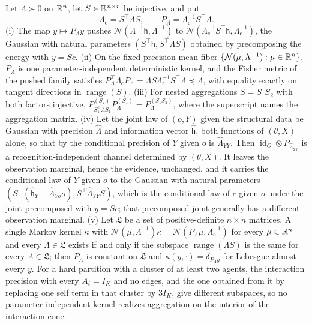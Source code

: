 Let \(\Lambda\succ0\) on \(\mathbb R^n\), let \(S\in\mathbb R^{n\times r}\) be injective,
and put
\begin{equation}
\Lambda_{\mathrm c}=S^\top\Lambda S,
\qquad
P_\Lambda=\Lambda_{\mathrm c}^{-1}S^\top\Lambda .
\label{eq:ig-galerkin-projector}
\end{equation}
(i) The map \(y\mapsto P_\Lambda y\) pushes
\(\mathcal N(\Lambda^{-1}\mathsf h,\Lambda^{-1})\) to
\(\mathcal N(\Lambda_{\mathrm c}^{-1}S^\top\mathsf h,\Lambda_{\mathrm c}^{-1})\),
the Gaussian with natural parameters \((S^\top\mathsf h,S^\top\Lambda S)\)
obtained by precomposing the energy with \(y=Sc\).
(ii) On the fixed-precision mean fiber
\(\{\mathcal N(\mu,\Lambda^{-1}):\mu\in\mathbb R^n\}\), \(P_\Lambda\) is one
parameter-independent deterministic kernel, and the Fisher metric of the pushed
family satisfies
\(P_\Lambda^\top\Lambda_{\mathrm c}P_\Lambda
=\Lambda S\Lambda_{\mathrm c}^{-1}S^\top\Lambda\preceq\Lambda\), with equality
exactly on tangent directions in \(\operatorname{range}(S)\).
(iii) For nested aggregations \(S=S_1S_2\) with both factors injective,
\(P^{(S_2)}_{S_1^\top\Lambda S_1}P^{(S_1)}_\Lambda=P^{(S_1S_2)}_\Lambda\), where
the superscript names the aggregation matrix.
(iv) Let the joint law of \((o,Y)\) given the structural data be Gaussian with
precision \(\widehat\Lambda\) and information vector \(\widehat{\mathsf h}\), both
functions of \((\theta,X)\) alone, so that by
 the conditional
precision of \(Y\) given \(o\) is \(\widehat\Lambda_{YY}\). Then
\(\operatorname{id}_O\otimes P_{\widehat\Lambda_{YY}}\) is a recognition-independent
channel determined by \((\theta,X)\). It leaves the observation marginal, hence
the evidence, unchanged, and it carries the conditional law of \(Y\) given \(o\)
to the Gaussian with natural parameters
\((S^\top(\widehat{\mathsf h}_Y-\widehat\Lambda_{Yo}o),S^\top\widehat\Lambda_{YY}S)\), which is the
conditional law of \(c\) given \(o\) under the joint precomposed with \(y=Sc\);
that precomposed joint generally has a different observation marginal.
(v) Let \(\mathfrak L\) be a set of positive-definite \(n\times n\) matrices. A
single Markov kernel \(\kappa\) with
\(\mathcal N(\mu,\Lambda^{-1})\kappa=\mathcal N(P_\Lambda\mu,\Lambda_{\mathrm c}^{-1})\)
for every \(\mu\in\mathbb R^n\) and every \(\Lambda\in\mathfrak L\) exists if and only
if the subspace \(\operatorname{range}(\Lambda S)\) is the same for every
\(\Lambda\in\mathfrak L\); then \(P_\Lambda\) is constant on \(\mathfrak L\) and
\(\kappa(y,\cdot)=\delta_{P_\Lambda y}\) for Lebesgue-almost every \(y\). For a
hard partition with a cluster of at least two agents, the interaction precision
with every \(A_i=I_K\) and no edges, and the one obtained from it by replacing
one self term in that cluster by \(3I_K\), give different subspaces, so no
parameter-independent kernel realizes aggregation on the interior of the
interaction cone. 

